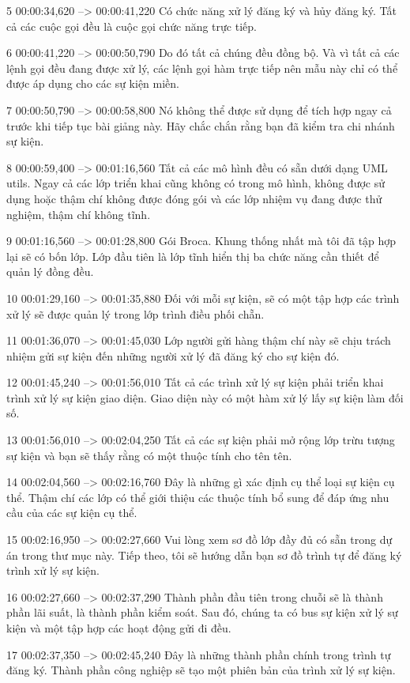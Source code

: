 5
00:00:34,620 --> 00:00:41,220
Có chức năng xử lý đăng ký và hủy đăng ký.  Tất cả các cuộc gọi đều là cuộc gọi chức năng trực tiếp.

6
00:00:41,220 --> 00:00:50,790
Do đó tất cả chúng đều đồng bộ.  Và vì tất cả các lệnh gọi đều đang được xử lý, các lệnh gọi hàm trực tiếp nên mẫu này chỉ có thể được áp dụng cho các sự kiện miền.

7
00:00:50,790 --> 00:00:58,800
Nó không thể được sử dụng để tích hợp ngay cả trước khi tiếp tục bài giảng này.  Hãy chắc chắn rằng bạn đã kiểm tra chi nhánh sự kiện.

8
00:00:59,400 --> 00:01:16,560
Tất cả các mô hình đều có sẵn dưới dạng UML utils.  Ngay cả các lớp triển khai cũng không có trong mô hình, không được sử dụng hoặc thậm chí không được đóng gói và các lớp nhiệm vụ đang được thử nghiệm, thậm chí không tĩnh.

9
00:01:16,560 --> 00:01:28,800
Gói Broca.  Khung thống nhất mà tôi đã tập hợp lại sẽ có bốn lớp.  Lớp đầu tiên là lớp tĩnh hiển thị ba chức năng cần thiết để quản lý đồng đều.

10
00:01:29,160 --> 00:01:35,880
Đối với mỗi sự kiện, sẽ có một tập hợp các trình xử lý sẽ được quản lý trong lớp trình điều phối chẵn.

11
00:01:36,070 --> 00:01:45,030
Lớp người gửi hàng thậm chí này sẽ chịu trách nhiệm gửi sự kiện đến những người xử lý đã đăng ký cho sự kiện đó.

12
00:01:45,240 --> 00:01:56,010
Tất cả các trình xử lý sự kiện phải triển khai trình xử lý sự kiện giao diện.  Giao diện này có một hàm xử lý lấy sự kiện làm đối số.

13
00:01:56,010 --> 00:02:04,250
Tất cả các sự kiện phải mở rộng lớp trừu tượng sự kiện và bạn sẽ thấy rằng có một thuộc tính cho tên tên.

14
00:02:04,560 --> 00:02:16,760
Đây là những gì xác định cụ thể loại sự kiện cụ thể.  Thậm chí các lớp có thể giới thiệu các thuộc tính bổ sung để đáp ứng nhu cầu của các sự kiện cụ thể.

15
00:02:16,950 --> 00:02:27,660
Vui lòng xem sơ đồ lớp đầy đủ có sẵn trong dự án trong thư mục này.  Tiếp theo, tôi sẽ hướng dẫn bạn sơ đồ trình tự để đăng ký trình xử lý sự kiện.

16
00:02:27,660 --> 00:02:37,290
Thành phần đầu tiên trong chuỗi sẽ là thành phần lãi suất, là thành phần kiểm soát.  Sau đó, chúng ta có bus sự kiện xử lý sự kiện và một tập hợp các hoạt động gửi đi đều.

17
00:02:37,350 --> 00:02:45,240
Đây là những thành phần chính trong trình tự đăng ký.  Thành phần công nghiệp sẽ tạo một phiên bản của trình xử lý sự kiện.

